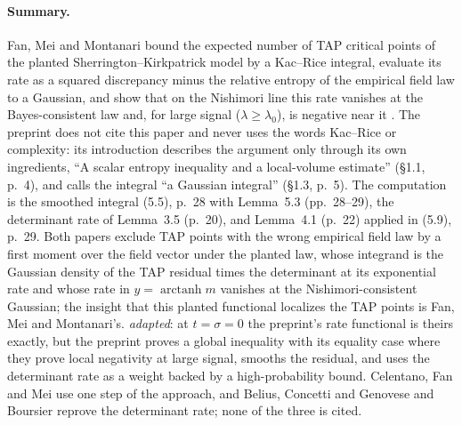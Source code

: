 \documentclass[11pt]{article}
\newcommand{\ploc}[2]{#1}
\newcommand{\sloc}[2]{\cite[#2]{#1}}
\newcommand{\rel}[1]{\textit{#1}}
\begin{document}
\paragraph{Summary.}
Fan, Mei and Montanari bound the expected number of TAP critical points of
the planted Sherrington--Kirkpatrick model by a Kac--Rice integral, evaluate
its rate as a squared discrepancy minus the relative entropy of the empirical
field law to a Gaussian, and show that on the Nishimori line this rate
vanishes at the Bayes-consistent law and, for large signal
($\lambda\ge\lambda_0$), is negative near it
\sloc{FanMeiMontanari2018-TAPFreeEnergyVariationalInference}{\S3, pp.~8--12; Prop.~5.2, p.~22}.
The preprint does not cite this paper and never uses the words Kac--Rice or
complexity: its introduction describes the argument only through its own
ingredients, ``A scalar entropy inequality and a local-volume estimate''
(\ploc{\S1.1, p.~4}{introduction.tex:122--125}), and calls the integral ``a
Gaussian integral'' (\ploc{\S1.3, p.~5}{introduction.tex:191--192}).
The computation is the smoothed integral \ploc{(5.5), p.~28}{stability.tex:119--134}
with \ploc{Lemma~5.3 (pp.~28--29)}{stability.tex:136--203}, the determinant
rate of \ploc{Lemma~3.5 (p.~20)}{matrices.tex:721--742}, and
\ploc{Lemma~4.1 (p.~22)}{entropy.tex:16--204} applied in
\ploc{(5.9), p.~29}{stability.tex:205--224}.
Both papers exclude TAP points with the wrong empirical field law by a first moment
over the field vector under the planted law, whose integrand is the Gaussian
density of the TAP residual times the determinant at its exponential rate and
whose rate in $y=\operatorname{arctanh}m$ vanishes at the Nishimori-consistent
Gaussian; the insight that this planted functional localizes the TAP points is
Fan, Mei and Montanari's.
\rel{adapted}: at $t=\sigma=0$ the preprint's rate functional is theirs
exactly, but the preprint proves a global inequality with its equality case
where they prove local negativity at large signal, smooths the residual, and
uses the determinant rate as a weight backed by a high-probability bound.
Celentano, Fan and Mei
\sloc{CelentanoFanMei2021-LocalConvexityTAPZ2Sync}{Lemma~4.7, p.~17; App.~B.2, pp.~41--43}
use one step of the approach, and Belius, Concetti and Genovese
\sloc{BeliusConcettiGenovese2024-DeterminantBrayMooreTAP}{Thms~1.1--1.2, pp.~2--3}
and Boursier \sloc{Boursier2026-LegendreStructureTAPComplexity}{Lemma~2.7, p.~20}
reprove the determinant rate; none of the three is cited.
\end{document}

